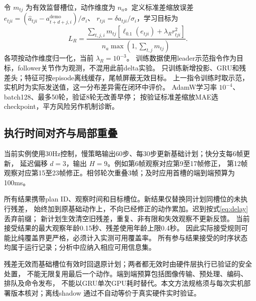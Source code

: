 令 $m_{tj}$ 为有效监督槽位，动作维度为 $n_a$。定义标准差缩放误差
$e_{tji}=(\widehat a_{tji}-a^{\mathrm{demo}}_{t+d+j,i})/\sigma_i$、
$r_{tji}=\delta a_{tji}/\sigma_i$，学习目标为
\begin{equation}
 L_R=\frac{\sum_{t,j,i}m_{tj}
 [\ell_{0.1}(e_{tji})+\lambda_R r_{tji}^2]}
 {n_a\max(1,\sum_{t,j}m_{tj})}.
 \label{eq:resloss}
\end{equation}
各项按动作维度归一化，当前 $\lambda_R=10^{-3}$。
训练数据使用leader示范指令作为目标，follower关节作为观测，不混用此前delta实验。
只训练新增投影、GRU和残差头；特征可按episode离线缓存，尾帧屏蔽无效目标。
上一指令训练时取示范，实机时为实际发送值，这一分布差异需在闭环中评价。
AdamW学习率 $10^{-4}$、batch128、最多50轮，验证8轮无改善早停；
按验证标准差缩放MAE选checkpoint，平方风险另作机制诊断。

\subsection{执行时间对齐与局部重叠}
当前实例使用30Hz控制，慢策略输出60步、每30步更新基础计划；快分支每6帧更新，
延迟偏移 $d=3$，输出 $H=9$。例如第6帧观察对应第9至17帧修正，
第12帧观察对应第15至23帧修正。相邻轮次重叠3帧；及时应用首槽的端到端预算为100ms。

所有结果携带plan ID、观察时间和目标槽位。新结果仅替换同计划同槽位的未执行残差，
始终加到原基础动作上，不向已经修正的动作累加。迟到按式\eqref{eq:delay}丢弃前缀；
新计划生效清空旧残差，重复、非有限和失效观察不更新反馈。
当前接受结果的最大观察年龄0.15秒、残差使用年龄上限0.4秒。
因此实际接受规则可能比纯覆盖界更严格，必须计入实测可用覆盖率。
所有参与结果接受的时序状态均属于运行记录；分析中应纳入相应可用信息集。

残差无效而基础槽位有效时回退原计划；两者都无效时由硬件层执行已验证的安全处置，
不能无限复用最后一个动作。端到端预算包括图像传输、预处理、编码、排队及命令发布，
不能以GRU单次GPU耗时替代。本文方法规格须与每次实机部署版本核对；离线shadow
通过不自动等价于真实硬件实时验证。

